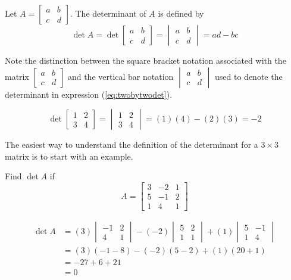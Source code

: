 \documentclass{ximera}
\begin{document}
\begin{definition}\label{def:twobytwodet}
Let $A=\begin{bmatrix}a&b\\c&d\end{bmatrix}$.  The determinant of $A$ is defined by 
\begin{equation}\label{eq:twobytwodet}\det{A}=\det{\begin{bmatrix}a&b\\c&d\end{bmatrix}}=\begin{vmatrix}a&b\\c&d\end{vmatrix}=ad-bc\end{equation}
\end{definition}
Note the distinction between the square bracket notation associated with the matrix $\begin{bmatrix}a&b\\c&d\end{bmatrix}$ and the vertical bar notation $\begin{vmatrix}a&b\\c&d\end{vmatrix}$ used to denote  the determinant in expression (\ref{eq:twobytwodet}).

\begin{example}\label{ex:2x2det}
$$\det{\begin{bmatrix}1&2\\3&4\end{bmatrix}}=\begin{vmatrix}1&2\\3&4\end{vmatrix}=(1)(4)-(2)(3)=-2$$
\end{example}

The easiest way to understand the definition of the determinant for a $3\times 3$ matrix is to start with an example.

\begin{example}\label{ex:threebythreedet1}
Find $\det{A}$ if 
$$A=\begin{bmatrix}3&-2&1\\5&-1&2\\1&4&1\end{bmatrix}$$
\begin{explanation}
\begin{align*}
\det{A}&=(3)\begin{vmatrix}-1&2\\4&1\end{vmatrix}-(-2)\begin{vmatrix}5&2\\1&1\end{vmatrix}+(1)\begin{vmatrix}5&-1\\1&4\end{vmatrix}\\
&=(3)(-1-8)-(-2)(5-2)+(1)(20+1)\\
&=-27+6+21\\
&=0
\end{align*}
\end{explanation}
\end{example}
\end{document}
